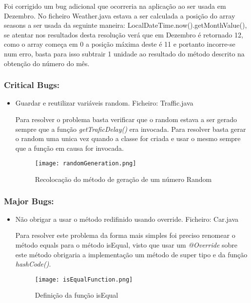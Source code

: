 \par Foi corrigido um bug adicional que ocorreria na aplicação ao ser usada em Dezembro. No ficheiro Weather.java estava a ser calculada a posição do array seasons a ser usada da seguinte maneira: LocalDateTime.now().getMonthValue(), se atentar nos resultados desta resolução verá que em Dezembro é retornado 12, como o array começa em 0 a posição máxima deste é 11 e portanto incorre-se num erro, basta para isso subtrair 1 unidade ao resultado do método descrito na obtenção do número do mês.

\subsubsection{Critical Bugs:}
\begin{itemize}
\item Guardar e reutilizar variáveis random.\newline
 Ficheiro: Traffic.java \newline


\par Para resolver o problema basta verificar que o random estava a ser gerado sempre que a função \textit{getTraficDelay()} era invocada. Para resolver basta gerar o random uma unica vez quando a classe for criada e usar o mesmo sempre que a função em causa for invocada.

\begin{figure}[H]

  \centering

  \texttt{[image: randomGeneration.png]}

  \caption {Recolocação do método de geração de um número Random}

  \label {fig06}

\end{figure}
\end{itemize}

\subsubsection{Major Bugs:}
\begin{itemize}
\item Não obrigar a usar o método redifinido usando override.\newline
 Ficheiro: Car.java\newline

\par Para resolver este problema da forma mais simples foi preciso renomear o método equals para o método isEqual, visto que usar um \textit{@Override} sobre este método obrigaria a implementação um método de super tipo e da função \textit{hashCode()}.


\begin{figure}[H]

  \centering

  \texttt{[image: isEqualFunction.png]}

  \caption {Definição da função isEqual}

  \label {fig07}

\end{figure}

\end{itemize}

